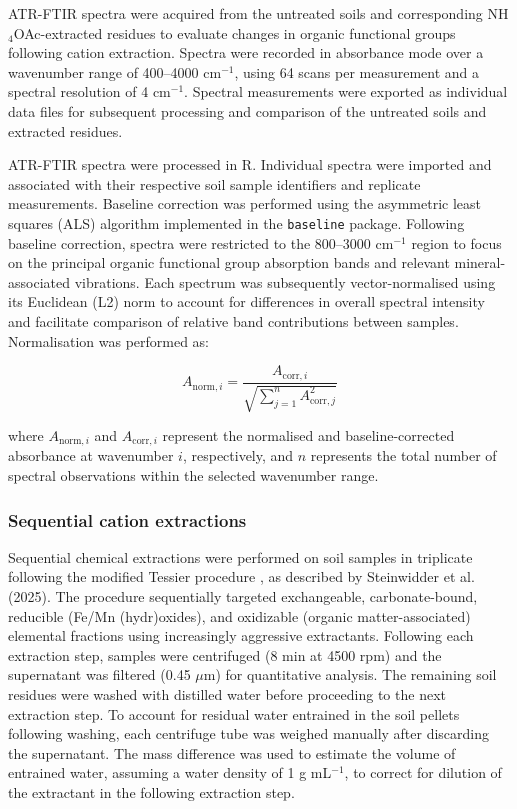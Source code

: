 \documentclass[preprint,12pt]{elsarticle}
\begin{document}
ATR-FTIR spectra were acquired from the untreated soils and corresponding NH$_4$OAc-extracted residues to evaluate changes in organic functional groups following cation extraction. Spectra were recorded in absorbance mode over a wavenumber range of 400--4000 cm$^{-1}$, using 64 scans per measurement and a spectral resolution of 4 cm$^{-1}$. Spectral measurements were exported as individual data files for subsequent processing and comparison of the untreated soils and extracted residues.

ATR-FTIR spectra were processed in R. Individual spectra were imported and associated with their respective soil sample identifiers and replicate measurements. Baseline correction was performed using the asymmetric least squares (ALS) algorithm implemented in the \texttt{baseline} package. Following baseline correction, spectra were restricted to the 800--3000 cm$^{-1}$ region to focus on the principal organic functional group absorption bands and relevant mineral-associated vibrations. Each spectrum was subsequently vector-normalised using its Euclidean (L2) norm to account for differences in overall spectral intensity and facilitate comparison of relative band contributions between samples. Normalisation was performed as:

\begin{equation}
A_{\mathrm{norm},i} =
\frac{A_{\mathrm{corr},i}}
{\sqrt{\displaystyle\sum_{j=1}^{n} A_{\mathrm{corr},j}^{2}}}
\label{eq:ftir_vector_normalisation}
\end{equation}

where $A_{\mathrm{norm},i}$ and $A_{\mathrm{corr},i}$ represent the normalised and baseline-corrected absorbance at wavenumber $i$, respectively, and $n$ represents the total number of spectral observations within the selected wavenumber range.

\subsubsection{Sequential cation extractions}

Sequential chemical extractions were performed on soil samples in triplicate following the modified Tessier procedure \citep{Tessier1979}, as described by Steinwidder et al. (2025). The procedure sequentially targeted exchangeable, carbonate-bound, reducible (Fe/Mn (hydr)oxides), and oxidizable (organic matter-associated) elemental fractions using increasingly aggressive extractants. Following each extraction step, samples were centrifuged (8 min at 4500 rpm) and the supernatant was filtered (0.45 $\mu$m) for quantitative analysis. The remaining soil residues were washed with distilled water before proceeding to the next extraction step. To account for residual water entrained in the soil pellets following washing, each centrifuge tube was weighed manually after discarding the supernatant. The mass difference was used to estimate the volume of entrained water, assuming a water density of 1 g mL\(^{-1}\), to correct for dilution of the extractant in the following extraction step.
\end{document}
